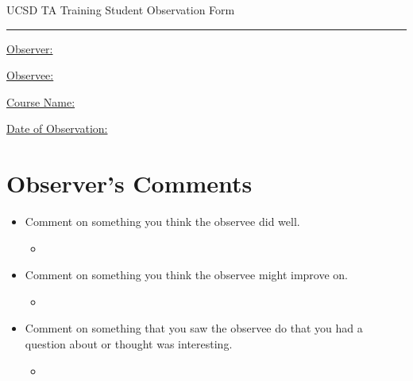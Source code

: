 \documentclass[journal,onecolumn,11pt,final]{IEEEtran}
\begin{document}
\begin{center}
	{\LARGE UCSD TA Training Student Observation Form}
\end{center}
\hrule height 1pt 

\vspace{10pt}
\noindent

\underline{Observer:}

\vspace{5pt}
\underline{Observee:}

\vspace{5pt}
\underline{Course Name:}

\vspace{5pt}
\underline{Date of Observation:}

\section*{Observer's Comments}

\begin{itemize}
	\item Comment on something you think the observee did well.
	\begin{itemize}
		\item %
	\end{itemize}
	
	\vspace{20pt}
	\item Comment on something you think the observee might improve on.
	\begin{itemize}
		\item %
	\end{itemize}
	
	\vspace{20pt}
	\item Comment on something that you saw the observee do that you had a question about or thought was interesting. 
	\begin{itemize}
		\item %
	\end{itemize}
	
\end{itemize}
\end{document}
